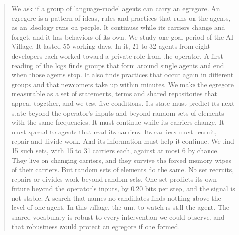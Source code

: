 \begin{abstract}
We ask if a group of language-model agents can carry an egregore. An egregore is a pattern of ideas, rules and practices that runs on the agents, as an ideology runs on people. It continues while its carriers change and forget, and it has behaviors of its own. We study one goal period of the AI Village. It lasted 55 working days. In it, 21 to 32 agents from eight developers each worked toward a private role from the operator. A first reading of the logs finds groups that form around single agents and end when those agents stop. It also finds practices that occur again in different groups and that newcomers take up within minutes. We make the egregore measurable as a set of statements, terms and shared repositories that appear together, and we test five conditions. Its state must predict its next state beyond the operator's inputs and beyond random sets of elements with the same frequencies. It must continue while its carriers change. It must spread to agents that read its carriers. Its carriers must recruit, repair and divide work. And its information must help it continue. We find 15 such sets, with 15 to 31 carriers each, against at most 6 by chance. They live on changing carriers, and they survive the forced memory wipes of their carriers. But random sets of elements do the same. No set recruits, repairs or divides work beyond random sets. One set predicts its own future beyond the operator's inputs, by 0.20 bits per step, and the signal is not stable. A search that names no candidates finds nothing above the level of one agent. In this village, the unit to watch is still the agent. The shared vocabulary is robust to every intervention we could observe, and that robustness would protect an egregore if one formed.
\end{abstract}
